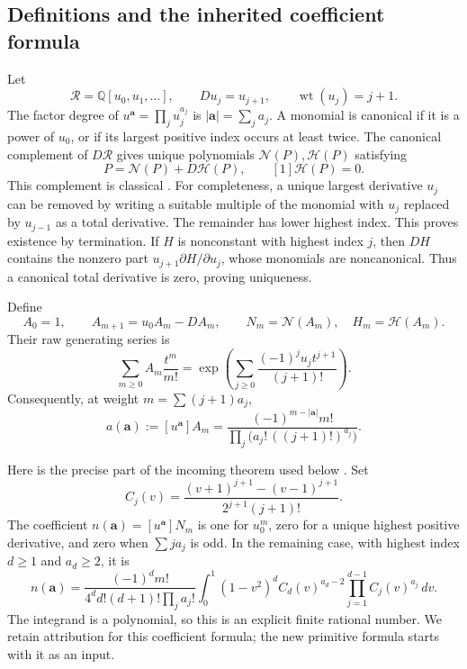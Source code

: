\documentclass[11pt,a4paper]{article}
\theoremstyle{definition}
\theoremstyle{remark}
\numberwithin{equation}{section}
\begin{document}
\subsection{Definitions and the inherited coefficient formula}

Let
\[
 \mathcal R=\mathbb Q[u_0,u_1,\ldots],\qquad Du_j=u_{j+1},
 \qquad \operatorname{wt}(u_j)=j+1.
\]
The factor degree of $u^{\boldsymbol a}=\prod_j u_j^{a_j}$ is
$|\boldsymbol a|=\sum_j a_j$. A monomial is canonical if it is a
power of $u_0$, or if its largest positive index occurs at least twice.
The canonical complement of $D\mathcal R$ gives unique polynomials
$\mathcal N(P),\mathcal H(P)$ satisfying
\begin{equation}\label{hp:decomposition}
 P=\mathcal N(P)+D\mathcal H(P),\qquad
 [1]\mathcal H(P)=0.
\end{equation}
This complement is classical \cite[Proposition~4.10]{Guo2014}.
For completeness, a unique largest derivative $u_j$ can be removed by
writing a suitable multiple of the monomial with $u_j$ replaced by
$u_{j-1}$ as a total derivative. The remainder has lower highest
index. This proves existence by termination. If $H$ is nonconstant
with highest index $j$, then $DH$ contains the nonzero part
$u_{j+1}\partial H/\partial u_j$, whose monomials are noncanonical.
Thus a canonical total derivative is zero, proving uniqueness.

Define
\begin{equation}\label{hp:hierarchy}
 A_0=1,\qquad A_{m+1}=u_0A_m-DA_m,
 \qquad N_m=\mathcal N(A_m),\quad H_m=\mathcal H(A_m).
\end{equation}
Their raw generating series is
\begin{equation}\label{hp:raw-generator}
 \sum_{m\ge0}A_m\frac{t^m}{m!}
 =\exp\left(\sum_{j\ge0}
                   \frac{(-1)^j u_jt^{j+1}}{(j+1)!}\right).
\end{equation}
Consequently, at weight $m=\sum(j+1)a_j$,
\begin{equation}\label{hp:raw-coefficient}
 a(\boldsymbol a):=[u^{\boldsymbol a}]A_m
 =\frac{(-1)^{m-|\boldsymbol a|}m!}
        {\prod_j\bigl(a_j!\,((j+1)!)^{a_j}\bigr)}.
\end{equation}

Here is the precise part of the incoming theorem used below
\cite{UniversalIncoming}. Set
\begin{equation}\label{hp:C}
 C_j(v)=\frac{(v+1)^{j+1}-(v-1)^{j+1}}
                  {2^{j+1}(j+1)!}.
\end{equation}
The coefficient $n(\boldsymbol a)=[u^{\boldsymbol a}]N_m$ is one
for $u_0^m$, zero for a unique highest positive derivative, and zero
when $\sum j a_j$ is odd. In the remaining case, with highest index
$d\ge1$ and $a_d\ge2$, it is
\begin{equation}\label{hp:normal-coefficient}
 n(\boldsymbol a)=
 \frac{(-1)^d m!}{4^d d!(d+1)!\prod_j a_j!}
 \int_0^1(1-v^2)^d
     C_d(v)^{a_d-2}\prod_{j=1}^{d-1}C_j(v)^{a_j}\,dv.
\end{equation}
The integrand is a polynomial, so this is an explicit finite rational
number. We retain attribution for this coefficient formula; the new
primitive formula starts with it as an input.
\end{document}
